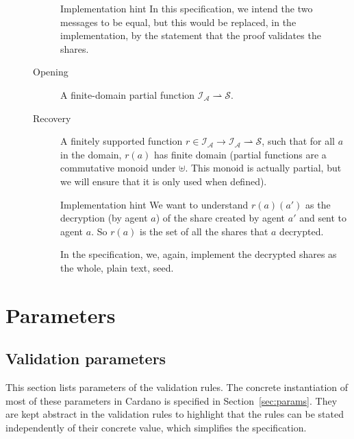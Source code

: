 \documentclass{article}
\newenvironment{record}{\begin{description}[font=\it]}{\end{description}}
\newenvironment{implementationhint}{\begin{bclogo}[noborder=true,
    logo=\bccrayon, epBarre=3, couleurBarre=PineGreen]{Implementation hint}}{\end{bclogo}}
\newcommand{\idsof}[1]{\mathcal{I}\!_#1}
\newcommand{\agentids}{\idsof{\mathcal{A}}}
\newcommand{\seeds}{\mathcal{S}}
\begin{document}
\begin{description}
\begin{record}
\begin{description}
\begin{implementationhint}
        In this specification, we intend the two messages to be equal,
        but this would be replaced, in the implementation, by the
        statement that the proof validates the shares.
      \end{implementationhint}
    \item[Opening] A finite-domain partial function $\agentids⇀\seeds$.
    \item[Recovery] A finitely supported function
      $r∈\agentids→\agentids⇀\seeds$, such that for all $a$ in the
      domain, $r(a)$ has finite domain (partial functions are a commutative monoid
      under $⊎$. This monoid is actually partial, but we will ensure
      that it is only used when defined).

      \begin{implementationhint}
        We want to understand $r(a)(a')$ as the decryption (by agent $a$) of the
        share created by agent $a'$ and sent to agent $a$. So $r(a)$ is the set
        of all the shares that $a$ decrypted.

        In the specification, we, again, implement the decrypted
        shares as the whole, plain text, seed.
      \end{implementationhint}
    \end{description}

  \end{record}

\end{description}

\section{Parameters}
\label{sec:parameters}

\subsection{Validation parameters}
\label{sec:validation-parameters}

This section lists parameters of the validation rules. The concrete
instantiation of most of these parameters in Cardano is specified in
Section~\ref{sec:params}. They are kept abstract in the validation
rules to highlight that the rules can be stated independently of their
concrete value, which simplifies the specification.
\end{document}
